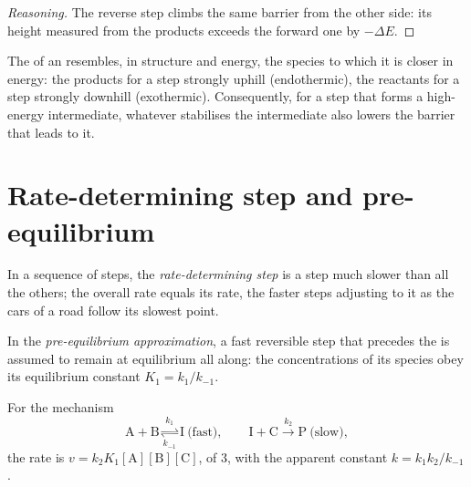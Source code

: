 \begin{proof}[Reasoning]
The reverse step climbs the same barrier from the other side: its height
measured from the products exceeds the forward one by $-\Delta E$.
\end{proof}

\begin{proposition}\label{prop:b1:elementary-steps:hammond}
The  of an  resembles, in structure and
energy, the species to which it is closer in energy: the products for a
step strongly uphill (endothermic), the reactants for a step strongly
downhill (exothermic). Consequently, for a step that forms a high-energy
intermediate, whatever stabilises the intermediate also lowers the
barrier that leads to it.
\end{proposition}
\admitted

\section{Rate-determining step and pre-equilibrium}

\begin{definition}\label{def:b1:elementary-steps:rds}
In a sequence of steps, the \emph{rate-determining
step} is a step much slower than all the
others; the overall rate equals its rate, the faster steps adjusting to
it as the cars of a road follow its slowest point.
\end{definition}

\begin{definition}\label{def:b1:elementary-steps:pre-equilibrium}
In the \emph{pre-equilibrium approximation},
a fast reversible step that precedes the  is assumed to remain at equilibrium all along: the concentrations
of its species obey its equilibrium constant $K_1 = k_1/k_{-1}$.
\end{definition}

\begin{proposition}\label{prop:b1:elementary-steps:pre-equilibrium-law}
For the mechanism
\[
  \mathrm{A} + \mathrm{B} \underset{k_{-1}}{\overset{k_1}{\rightleftharpoons}} \mathrm{I}
  \ \text{(fast)}, \qquad
  \mathrm{I} + \mathrm{C} \xrightarrow{\ k_2\ } \mathrm{P} \ \text{(slow)},
\]
the rate is $v = k_2K_1[\mathrm{A}][\mathrm{B}][\mathrm{C}]$, of  3, with the apparent constant $k = k_1k_2/k_{-1}$.
\end{proposition}

